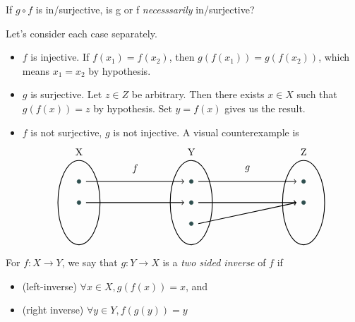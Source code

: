 \documentclass[11pt]{article}
\begin{document}
\begin{exercise}
  If \(g \circ f\) is in/surjective, is g or f \emph{necesssarily} in/surjective? 
\end{exercise}
\begin{solution}
  Let's consider each case separately.
  \begin{itemize}
    \item \(f\) is injective. If \(f(x_1)=f(x_2)\), then \(g(f(x_1))=g(f(x_2))\), which means \(x_1=x_2\) by hypothesis.
    \item \(g\) is surjective. Let \(z \in Z\) be arbitrary. Then there exists \(x \in X\) such that \(g(f(x))=z\) by hypothesis. Set \(y=f(x)\) gives us the result.
    \item \(f\) is not surjective, \(g\) is not injective. A visual counterexample is
    \[
      \begin{tikzpicture}
        \draw[thick] (-4,0) ellipse (0.75 and 1.5);
        \draw[thick] (0,0) ellipse (0.75 and 1.5);
        \draw[thick] (4,0) ellipse (0.75 and 1.5);
        \filldraw[DarkSlateGray] (-4,0.75) circle (2pt);
        \filldraw[DarkSlateGray] (-4,0) circle (2pt);
        \filldraw[DarkSlateGray] (0,0.75) circle (2pt);
        \filldraw[DarkSlateGray] (0,0) circle (2pt);
        \filldraw[DarkSlateGray] (0,-0.75) circle (2pt);
        \filldraw[DarkSlateGray] (4,0.75) circle (2pt);
        \filldraw[DarkSlateGray] (4,0) circle (2pt);
        \draw[thick, ->] (-3.75, 0.75) -- (-0.25, 0.75);
        \draw[thick, ->] (-3.75, 0) -- (-0.25, 0);
        \draw[thick, ->] (0.25, 0.75) -- (3.75, 0.75);
        \draw[thick, ->] (0.25, 0) -- (3.75, 0);
        \draw[thick, ->] (0.25, -0.75) -- (3.75, 0);
        \node at (-4,1.8) {X};
        \node at (0,1.8) {Y};
        \node at (4,1.8) {Z};
        \node at (-2,1.2) {\(f\)};
        \node at (2,1.2) {\(g\)};
      \end{tikzpicture}
    \]
  \end{itemize}
\end{solution}

\begin{definition}
  For \(f: X \rightarrow Y\), we say that \(g:Y \rightarrow X\) is a \textit{two sided inverse} of \(f\) if
  \begin{itemize}
    \item (left-inverse) \(\forall x \in X, g(f(x))=x\), and
    \item (right inverse) \(\forall y \in Y, f(g(y))=y\) 
  \end{itemize}
\end{definition}
\end{document}
